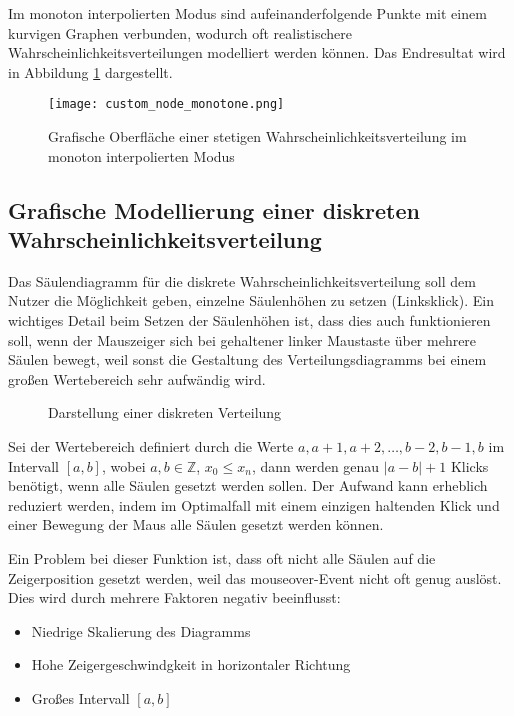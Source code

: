 Im monoton interpolierten Modus sind aufeinanderfolgende Punkte mit einem kurvigen Graphen verbunden, wodurch oft realistischere Wahrscheinlichkeitsverteilungen modelliert werden können. Das Endresultat wird in Abbildung \ref{fig:customnodemonotone} dargestellt.

\begin{figure}[H]
    \centering
    \texttt{[image: custom\_node\_monotone.png]}
    \caption{Grafische Oberfläche einer stetigen Wahrscheinlichkeitsverteilung im monoton interpolierten Modus}
    \label{fig:customnodemonotone}
\end{figure}

\subsection{Grafische Modellierung einer diskreten Wahrscheinlichkeitsverteilung}

Das Säulendiagramm für die diskrete Wahrscheinlichkeitsverteilung soll dem Nutzer die Möglichkeit geben, einzelne Säulenhöhen zu setzen (Linksklick). Ein wichtiges Detail beim Setzen der Säulenhöhen ist, dass dies auch funktionieren soll, wenn der Mauszeiger sich bei gehaltener linker Maustaste über mehrere Säulen bewegt, weil sonst die Gestaltung des Verteilungsdiagramms bei einem großen Wertebereich sehr aufwändig wird. 

\begin{figure}[H]
    \center
    \caption{Darstellung einer diskreten Verteilung}
\end{figure}

Sei der Wertebereich definiert durch die Werte $a,a+1,a+2,\dots,b-2,b-1,b$ im Intervall $[a,b]$, wobei $a,b \in\mathbb{Z}$, $x_0 \le x_n$, dann werden genau $|a-b|+1$ Klicks benötigt, wenn alle Säulen gesetzt werden sollen. Der Aufwand kann erheblich reduziert werden, indem im Optimalfall mit einem einzigen haltenden Klick und einer Bewegung der Maus alle Säulen gesetzt werden können.

Ein Problem bei dieser Funktion ist, dass oft nicht alle Säulen auf die Zeigerposition gesetzt werden, weil das mouseover-Event nicht oft genug auslöst. Dies wird durch mehrere Faktoren negativ beeinflusst:
\begin{itemize}
    \item Niedrige Skalierung des Diagramms
    \item Hohe Zeigergeschwindgkeit in horizontaler Richtung
    \item Großes Intervall $[a,b]$
 \end{itemize}

